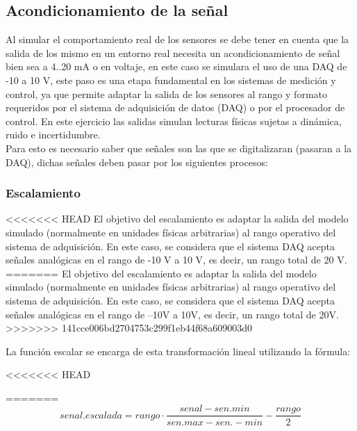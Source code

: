 \documentclass[conference]{IEEEtran}
\begin{document}
\subsection{Acondicionamiento de la señal}

Al simular el comportamiento real de los sensores se debe tener en cuenta que la salida de los mismo en un entorno real necesita un acondicionamiento de señal bien sea a 4..20 mA o en voltaje, en este caso se simulara el uso de una DAQ de -10 a 10 V, este paso es una etapa fundamental en los sistemas de medición y control, ya que permite adaptar la salida de los sensores al rango y formato requeridos por el sistema de adquisición de datos (DAQ) o por el procesador de control. En este ejercicio las salidas simulan lecturas físicas sujetas a dinámica, ruido e incertidumbre.\\

Para esto es necesario saber que señales son las que se digitalizaran (pasaran a la DAQ), dichas señales deben pasar por los siguientes procesos:\\

\subsubsection{Escalamiento}

<<<<<<< HEAD
El objetivo del escalamiento es adaptar la salida del modelo simulado (normalmente en unidades físicas arbitrarias) al rango operativo del sistema de adquisición. En este caso, se considera que el sistema DAQ acepta señales analógicas en el rango de -10 V a 10 V, es decir, un rango total de 20 V.
=======
El objetivo del escalamiento es adaptar la salida del modelo simulado (normalmente en unidades físicas arbitrarias) al rango operativo del sistema de adquisición. En este caso, se considera que el sistema DAQ acepta se\~nales analógicas en el rango de –10V a 10V, es decir, un rango total de 20V.\\
>>>>>>> 141cce006bd2704753c299f1eb44f68a609003d0

La función escalar se encarga de esta transformación lineal utilizando la fórmula:

<<<<<<< HEAD

=======
\[
senal.escalada = rango \cdot \frac{senal-sen.min}{sen.max-sen.-min} - \frac{rango}{2}
\]
\end{document}
